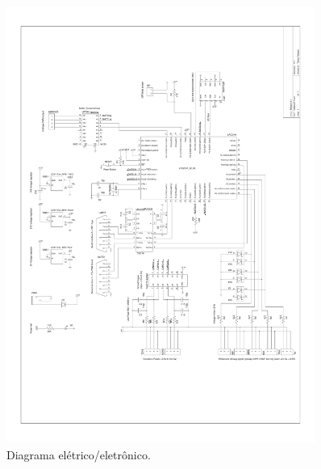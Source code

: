 \begin{figure}[htpb!]
  \centering
  \includegraphics[width=0.9\textwidth, keepaspectratio]{./figuras/hardware2_2.pdf}
  \caption{Diagrama elétrico/eletrônico.}
  \label{fig:diagrama_eletrico_eletronico}
\end{figure}


